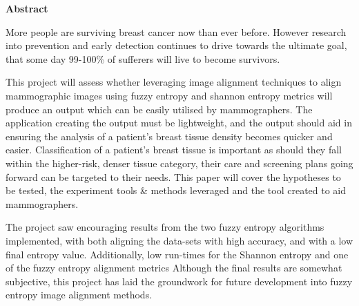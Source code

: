\thispagestyle{empty}

\begin{center}
    {\LARGE\bf Abstract}
\end{center}

More people are surviving breast cancer now than ever before. However research into prevention and early detection continues to drive towards the ultimate goal, that some day 99-100\% of sufferers will live to become survivors.

This project will assess whether leveraging image alignment techniques to align mammographic images using fuzzy entropy and shannon entropy metrics will produce an output which can be easily utilised by mammographers. The application creating the output must be lightweight, and the output should aid in ensuring the analysis of a patient's breast tissue density becomes quicker and easier. Classification of a patient's breast tissue is important as should they fall within the higher-risk, denser tissue category, their care and screening plans going forward can be targeted to their needs. This paper will cover the hypotheses to be tested, the experiment tools \& methods leveraged and the tool created to aid mammographers.

The project saw encouraging results from the two fuzzy entropy algorithms implemented, with both aligning the data-sets with high accuracy, and with a low final entropy value. Additionally, low run-times for the Shannon entropy and one of the fuzzy entropy alignment metrics Although the final results are somewhat subjective, this project has laid the groundwork for future development into fuzzy entropy image alignment methods.
